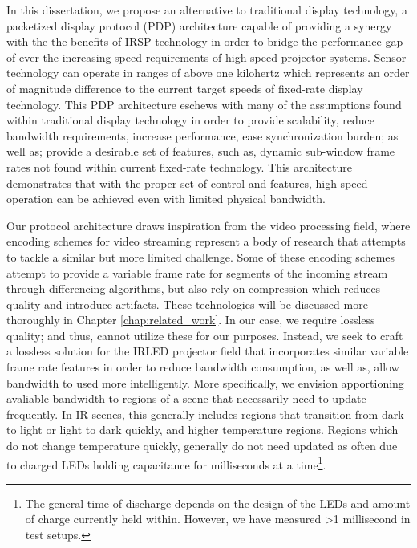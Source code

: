 In this dissertation, we propose an alternative to traditional display technology, a packetized display protocol (PDP) architecture capable of providing a synergy with the the benefits of IRSP technology in order to bridge the performance gap of ever the increasing speed requirements of high speed projector systems. Sensor technology can operate in ranges of above one kilohertz which represents an order of magnitude difference to the current target speeds of fixed-rate display technology. This PDP architecture eschews with many of the assumptions found within traditional display technology in order to provide scalability, reduce bandwidth requirements, increase performance, ease synchronization burden; as well as; provide a desirable set of features, such as, dynamic sub-window frame rates not found within current fixed-rate technology. This architecture demonstrates that with the proper set of control and features, high-speed operation can be achieved even with limited physical bandwidth.

Our protocol architecture draws inspiration from the video processing field, where encoding schemes for video streaming represent a body of research that attempts to tackle a similar but more limited challenge\cite{BakarEtAl2017}. Some of these encoding schemes attempt to provide a variable frame rate for segments of the incoming stream through differencing algorithms, but also rely on compression\cite{CastilloEtAl2012} which reduces quality and introduce artifacts. These technologies will be discussed more thoroughly in Chapter \ref{chap:related_work}. In our case, we require lossless quality; and thus, cannot utilize these for our purposes. Instead, we seek to craft a lossless solution for the IRLED projector field that incorporates similar variable frame rate features in order to reduce bandwidth consumption, as well as, allow bandwidth to used more intelligently. More specifically, we envision apportioning avaliable bandwidth to regions of a scene that necessarily need to update frequently. In IR scenes, this generally includes regions that transition from dark to light or light to dark quickly, and higher temperature regions. Regions which do not change temperature quickly, generally do not need updated as often due to charged LEDs holding capacitance for milliseconds at a time\footnote{The general time of discharge depends on the design of the LEDs and amount of charge currently held within. However, we have measured \textgreater1 millisecond in test setups.}.

